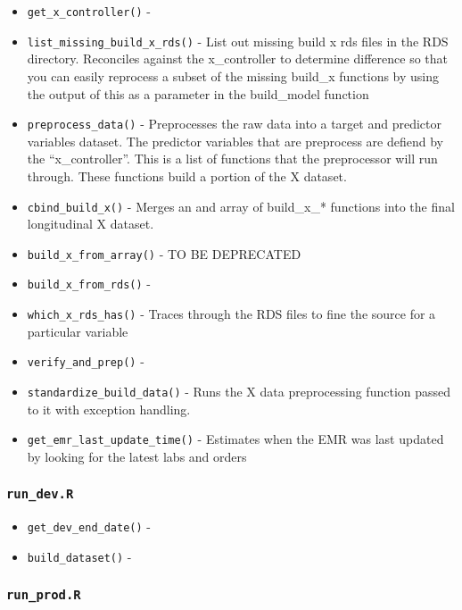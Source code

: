 \documentclass[
]{book}
\providecommand{\tightlist}{%
  \setlength{\itemsep}{0pt}\setlength{\parskip}{0pt}}
\begin{document}
\begin{itemize}
\tightlist
\item
  \texttt{get\_x\_controller()} -
\item
  \texttt{list\_missing\_build\_x\_rds()} - List out missing build x rds files in the RDS directory. Reconciles against the x\_controller to determine difference so that you can easily reprocess a subset of the missing build\_x functions by using the output of this as a parameter in the build\_model function
\item
  \texttt{preprocess\_data()} - Preprocesses the raw data into a target and predictor variables dataset. The predictor variables that are preprocess are defiend by the ``x\_controller''. This is a list of functions that the preprocessor will run through. These functions build a portion of the X dataset.
\item
  \texttt{cbind\_build\_x()} - Merges an and array of build\_x\_* functions into the final longitudinal X dataset.
\item
  \texttt{build\_x\_from\_array()} - TO BE DEPRECATED
\item
  \texttt{build\_x\_from\_rds()} -
\item
  \texttt{which\_x\_rds\_has()} - Traces through the RDS files to fine the source for a particular variable
\item
  \texttt{verify\_and\_prep()} -
\item
  \texttt{standardize\_build\_data()} - Runs the X data preprocessing function passed to it with exception handling.
\item
  \texttt{get\_emr\_last\_update\_time()} - Estimates when the EMR was last updated by looking for the latest labs and orders
\end{itemize}

\hypertarget{run_dev.r}{%
\subsubsection{\texorpdfstring{\texttt{run\_dev.R}}{run\_dev.R}}\label{run_dev.r}}

\begin{itemize}
\tightlist
\item
  \texttt{get\_dev\_end\_date()} -
\item
  \texttt{build\_dataset()} -
\end{itemize}

\hypertarget{run_prod.r}{%
\subsubsection{\texorpdfstring{\texttt{run\_prod.R}}{run\_prod.R}}\label{run_prod.r}}
\end{document}
